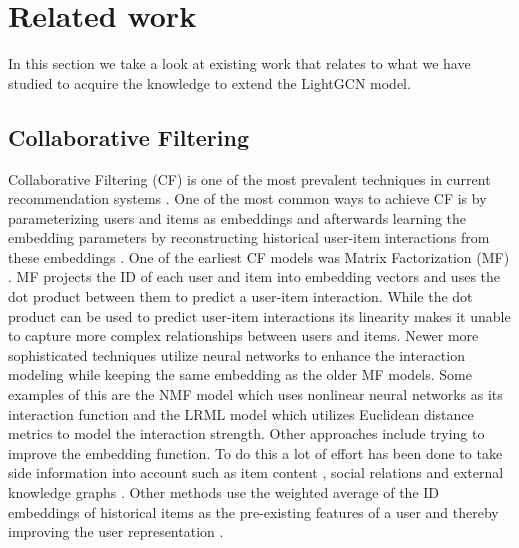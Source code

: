 \section{Related work}
In this section we take a look at existing work that relates to what we have studied to acquire the knowledge to extend the LightGCN model.

\subsection{Collaborative Filtering}
Collaborative Filtering (CF) is one of the most prevalent techniques in current recommendation systems \cite{YT_rec,NGCF_2019,Pint_rec,COL_MEM_NET}.
One of the most common ways to achieve CF is by parameterizing users and items as embeddings and afterwards learning the embedding parameters by reconstructing historical user-item interactions from these embeddings \cite{NGCF_2019}.
One of the earliest CF models was Matrix Factorization (MF) \cite{Matrix-factorization-techniques, BAY_PER_RAN}.
MF  projects the ID of each user and item into embedding vectors and uses the dot product between them to predict a user-item interaction.
While the dot product can be used to predict user-item interactions its linearity makes it unable to capture more complex relationships between users and items.
Newer more sophisticated techniques utilize neural networks to enhance the interaction modeling while keeping the same embedding as the older MF models.
Some examples of this are the NMF model \cite{NEU_COL_FIL} which uses nonlinear neural networks as its interaction function and the LRML model \cite{LAT_REL_MET} which utilizes Euclidean distance metrics to model the interaction strength.
Other approaches include trying to improve the embedding function.
To do this a lot of effort has been done to take side information into account such as item content \cite{ATT_COL_FIL_MUL}, social relations \cite{REC_SOC_USE} and external knowledge graphs \cite{KGAT, KNO_GRA_REC}.
Other methods use the weighted average of the ID embeddings of historical items as the pre-existing features of a user and thereby improving the user representation \cite{SVD_PLUSPLUS,FISM}.

